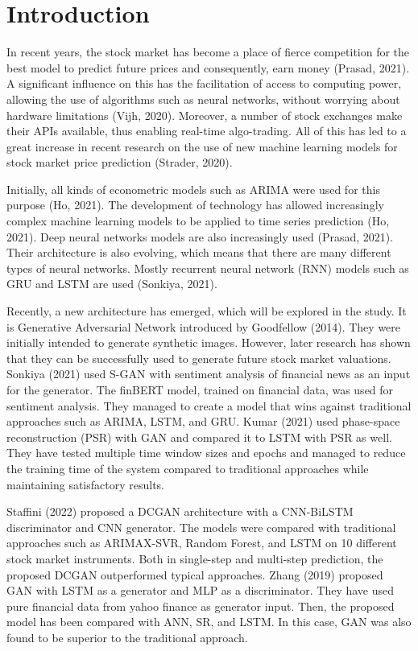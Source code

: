 \documentclass[11pt]{article} %
\begin{document}
\renewcommand\contentsname{Table of Contents}

\tableofcontents

\pagebreak

\section{Introduction}
In recent years, the stock market has become a place of fierce competition for the best model to predict future prices and consequently, earn money (Prasad, 2021). 
A significant influence on this has the facilitation of access to computing power, allowing the use of algorithms such as neural networks, without worrying about hardware limitations (Vijh, 2020). Moreover, a number of stock exchanges make their APIs available, thus enabling real-time algo-trading. All of this has led to a great increase in recent research on the use of new machine learning models for stock market price prediction (Strader, 2020).  

Initially, all kinds of econometric models such as ARIMA were used for this purpose (Ho, 2021). The development of technology has allowed increasingly complex machine learning models to be applied to time series prediction  (Ho, 2021). Deep neural networks models are also increasingly used (Prasad, 2021). Their architecture is also evolving, which means that there are many different types of neural networks. Mostly recurrent neural network (RNN) models such as GRU and LSTM are used (Sonkiya, 2021). 

Recently, a new architecture has emerged, which will be explored in the study. It is Generative Adversarial Network introduced by Goodfellow (2014). They were initially intended to generate synthetic images. However, later research has shown that they can be successfully used to generate future stock market valuations. Sonkiya (2021) used S-GAN with sentiment analysis of financial news as an input for the generator. The finBERT model, trained on financial data, was used for sentiment analysis. They managed to create a model that wins against traditional approaches such as ARIMA, LSTM, and GRU. Kumar (2021) used phase-space reconstruction (PSR) with GAN and compared it to LSTM with PSR as well. They have tested multiple time window sizes and epochs and managed to reduce the training time of the system compared to traditional approaches while maintaining satisfactory results. 

Staffini (2022) proposed a DCGAN architecture with a CNN-BiLSTM discriminator and CNN generator. The models were compared with traditional approaches such as ARIMAX-SVR, Random Forest, and LSTM on 10 different stock market instruments. Both in single-step and multi-step prediction, the proposed DCGAN outperformed typical approaches. Zhang (2019) proposed GAN with LSTM as a generator and MLP as a discriminator. They have used pure financial data from yahoo finance as generator input. Then, the proposed model has been compared with ANN, SR, and LSTM. In this case, GAN was also found to be superior to the traditional approach.  
\end{document}
